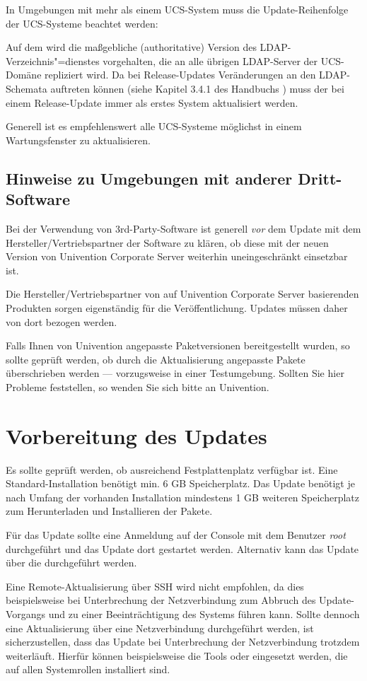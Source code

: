 In Umgebungen mit mehr als einem UCS-System muss die Update-Reihenfolge der
UCS-Systeme beachtet werden:

Auf dem \ucsMaster{} wird die maßgebliche (authoritative) Version des
LDAP-Verzeichnis"=dienstes vorgehalten, die an alle übrigen LDAP-Server
der UCS-Domäne repliziert wird. Da bei Release-Updates Veränderungen
an den LDAP-Schemata auftreten können (siehe
Kapitel 3.4.1 des Handbuchs \cite{UCS-Handbuch}) muss der \ucsMaster{} bei einem
Release-Update immer als erstes System aktualisiert werden.

Generell ist es empfehlenswert alle UCS-Systeme möglichst in einem
Wartungsfenster zu aktualisieren.

\section{Hinweise zu Umgebungen mit anderer Dritt-Software}

Bei der Verwendung von 3rd-Party-Software ist generell \emph{vor} dem Update
mit dem Hersteller/Vertriebspartner der Software zu klären, ob
diese mit der neuen Version von Univention Corporate Server weiterhin
uneingeschränkt einsetzbar ist. 

Die Hersteller/Vertriebspartner von auf Univention Corporate Server
basierenden Produkten sorgen eigenständig für die Veröffentlichung. Updates
müssen daher von dort bezogen werden.

Falls Ihnen von Univention angepasste Paketversionen bereitgestellt wurden, so
sollte geprüft werden, ob durch die Aktualisierung angepasste Pakete
überschrieben werden --- vorzugsweise in einer Testumgebung. Sollten Sie hier
Probleme feststellen, so wenden Sie sich bitte an Univention.

\chapter{Vorbereitung des Updates}
Es sollte geprüft werden, ob ausreichend Festplattenplatz verfügbar ist. Eine
Standard-Installation benötigt min. 6 GB Speicherplatz. Das
Update benötigt je nach Umfang der vorhanden Installation mindestens 1 GB
weiteren Speicherplatz zum Herunterladen und Installieren der Pakete.

Für das Update sollte eine Anmeldung auf der Console mit dem
Benutzer \emph{root} durchgeführt und das Update dort gestartet werden.
Alternativ kann das Update über die \ucsUMC{} durchgeführt werden.

Eine Remote-Aktualisierung über SSH wird nicht empfohlen, da dies
beispielsweise bei Unterbrechung der Netzverbindung zum Abbruch des
Update-Vorgangs und zu einer Beeinträchtigung des Systems führen kann. Sollte
dennoch eine Aktualisierung über eine Netzverbindung durchgeführt werden, ist
sicherzustellen, dass das Update bei Unterbrechung der Netzverbindung trotzdem
weiterläuft. Hierfür können beispielsweise die Tools  oder
 eingesetzt werden, die auf allen Systemrollen installiert sind.




